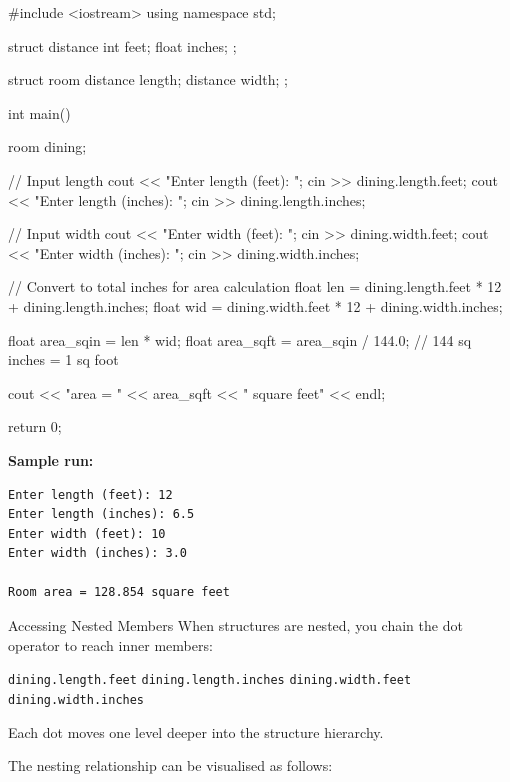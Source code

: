 \begin{cppcode}
#include <iostream>
using namespace std;

struct distance {
    int   feet;
    float inches;
};

struct room {
    distance length;
    distance width;
};

int main() {
    room dining;

    // Input length
    cout << "Enter length (feet): ";
    cin  >> dining.length.feet;
    cout << "Enter length (inches): ";
    cin  >> dining.length.inches;

    // Input width
    cout << "Enter width (feet): ";
    cin  >> dining.width.feet;
    cout << "Enter width (inches): ";
    cin  >> dining.width.inches;

    // Convert to total inches for area calculation
    float len = dining.length.feet * 12 + dining.length.inches;
    float wid = dining.width.feet  * 12 + dining.width.inches;

    float area_sqin = len * wid;
    float area_sqft = area_sqin / 144.0;  // 144 sq inches = 1 sq foot

    cout << "\nRoom area = " << area_sqft
         << " square feet" << endl;

    return 0;
}
\end{cppcode}

\noindent
\textbf{Sample run:}
\begin{verbatim}
Enter length (feet): 12
Enter length (inches): 6.5
Enter width (feet): 10
Enter width (inches): 3.0

Room area = 128.854 square feet
\end{verbatim}

\begin{conceptbox}{Accessing Nested Members}
When structures are nested, you chain the dot operator to reach inner
members:

\medskip
\texttt{dining.length.feet} \quad
\texttt{dining.length.inches} \quad
\texttt{dining.width.feet} \quad
\texttt{dining.width.inches}
\medskip

Each dot moves one level deeper into the structure hierarchy.
\end{conceptbox}

\noindent
The nesting relationship can be visualised as follows:

